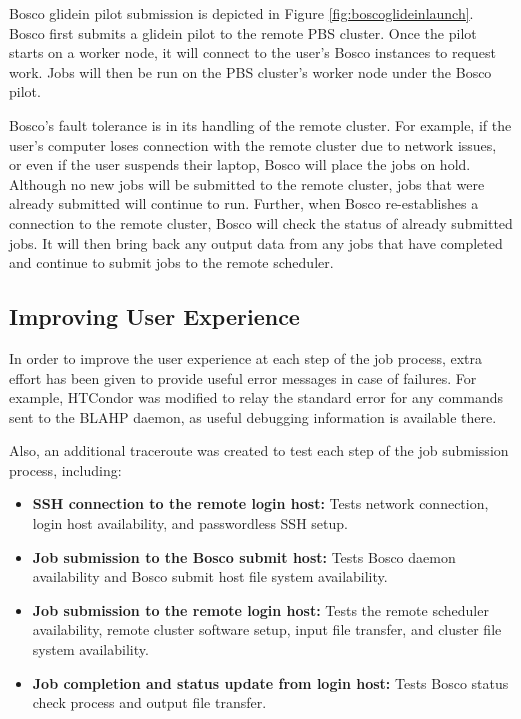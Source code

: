 Bosco glidein pilot submission is depicted in Figure \ref{fig:boscoglideinlaunch}.  Bosco first submits a glidein pilot to the remote PBS cluster.  Once the pilot starts on a worker node, it will connect to the user's Bosco instances to request work.  Jobs will then be run on the PBS cluster's worker node under the Bosco pilot.

Bosco's fault tolerance is in its handling of the remote cluster.  For example, if the user's computer loses connection with the remote cluster due to network issues, or even if the user suspends their laptop, Bosco will place the jobs on hold.  Although no new jobs will be submitted to the remote cluster, jobs that were already submitted will continue to run.  Further, when Bosco re-establishes a connection to the remote cluster, Bosco will check the status of already submitted jobs.  It will then bring back any output data from any jobs that have completed and continue to submit jobs to the remote scheduler.

\subsection{Improving User Experience}


In order to improve the user experience at each step of the job process, extra effort has been given to provide useful error messages in case of failures.  For example, HTCondor was modified to relay the standard error for any commands sent to the BLAHP daemon, as useful debugging information is available there.  

\label{sec:boscotraceroute}

Also, an additional traceroute was created to test each step of the job submission process, including:

\begin{itemize}
\item \textbf{SSH connection to the remote login host:}  Tests network connection, login host availability, and passwordless SSH setup.
\item \textbf{Job submission to the Bosco submit host:}  Tests Bosco daemon availability and Bosco submit host file system availability.
\item \textbf{Job submission to the remote login host:}  Tests the remote scheduler availability, remote cluster software setup, input file transfer, and cluster file system availability.
\item \textbf{Job completion and status update from login host:}  Tests Bosco status check process and output file transfer.
\end{itemize}

